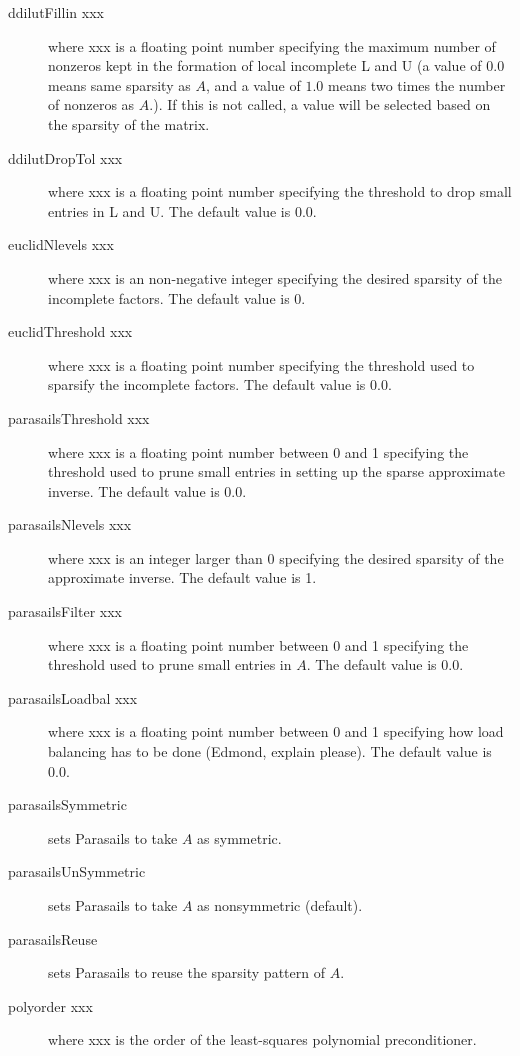 \begin{description}
\item[ddilutFillin xxx] where xxx is a floating point number specifying 
           the maximum number of nonzeros kept in the formation of local 
           incomplete L and U (a value of $0.0$ means same sparsity as $A$,
           and a value of $1.0$ means two times the number of nonzeros as
           $A$.).  If this is not called, a value will be selected
           based on the sparsity of the matrix.
\item[ddilutDropTol xxx] where xxx is a floating point number specifying the 
           threshold to drop small entries in L and U.  The default
           value is 0.0.
\item[euclidNlevels xxx] where xxx is an non-negative integer specifying 
           the desired sparsity of the incomplete factors.  The
           default value is 0.
\item[euclidThreshold xxx] where xxx is a floating point number specifying 
           the threshold used to sparsify the incomplete factors.  The default
           value is 0.0.
\item[parasailsThreshold xxx] where xxx is a floating point number between 0 
           and 1 specifying the threshold used to prune small entries
           in setting up the sparse approximate inverse.  The default
           value is 0.0.
\item[parasailsNlevels xxx] where xxx is an integer larger than 0 specifying 
           the desired sparsity of the approximate inverse.  The
           default value is 1.
\item[parasailsFilter xxx] where xxx is a floating point number between 0 
           and 1 specifying the threshold used to prune small entries
           in $A$.  The default value is 0.0.
\item[parasailsLoadbal xxx] where xxx is a floating point number between 0 
           and 1 specifying how load balancing has to be done 
           (Edmond, explain please).  The default value is 0.0.
\item[parasailsSymmetric] sets Parasails to take $A$ as symmetric.
\item[parasailsUnSymmetric] sets Parasails to take $A$ as nonsymmetric
                            (default).
\item[parasailsReuse] sets Parasails to reuse the sparsity pattern of $A$.
\item[polyorder xxx] where xxx is the order of the least-squares polynomial 
           preconditioner.
\end{description}

